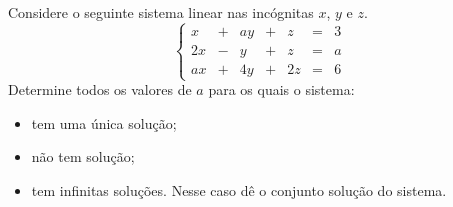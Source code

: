 \begin{problem} 
Considere o seguinte sistema linear nas incógnitas $x$, $y$ e $z$.
$$\left\{\begin{array}{rrrrrrr}
 x & + & ay & + &   z & = &  3\\
2x & - &  y & + &   z & = &  a\\
ax & + & 4y & + &  2z & = &  6
\end{array} \right.$$
\noindent Determine todos os valores de $a$ para os quais o sistema:
\begin{itemize}
\item[(a)] tem uma única solução;
\item[(b)] não tem solução;
\item[(c)] tem infinitas soluções. Nesse caso dê o conjunto solução do sistema.
\end{itemize}
\end{problem}
